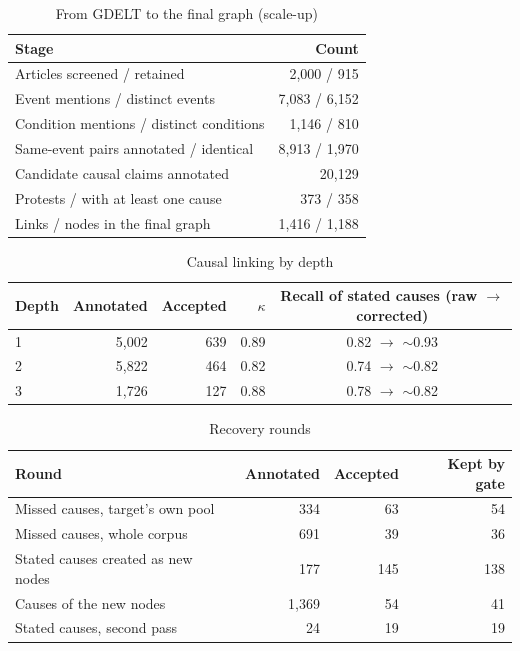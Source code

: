 \documentclass[pdflatex,sn-basic,lineno]{sn-jnl}
\theoremstyle{thmstylethree}
\theoremstyle{thmstyleone}
\begin{document}
\begin{table}[!htbp]
\caption{From GDELT to the final graph (scale-up)}
\label{tab:funnel}
\footnotesize
\begin{tabular*}{\textwidth}{@{\extracolsep\fill}lr@{}}
\toprule
Stage & Count \\
\midrule
Articles screened / retained & 2{,}000 / 915 \\
Event mentions / distinct events & 7{,}083 / 6{,}152 \\
Condition mentions / distinct conditions & 1{,}146 / 810 \\
Same-event pairs annotated / identical & 8{,}913 / 1{,}970 \\
Candidate causal claims annotated & 20{,}129 \\
Protests / with at least one cause & 373 / 358 \\
Links / nodes in the final graph & 1{,}416 / 1{,}188 \\
\bottomrule
\end{tabular*}
\end{table}

\begin{table}[!htbp]
\caption{Causal linking by depth}
\label{tab:levels}
\footnotesize
\begin{tabular*}{\textwidth}{@{\extracolsep\fill}lrrrc@{}}
\toprule
Depth & Annotated & Accepted & $\kappa$ & Recall of stated causes (raw $\rightarrow$ corrected) \\
\midrule
1 & 5{,}002 & 639 & 0.89 & 0.82 $\rightarrow$ $\sim$0.93 \\
2 & 5{,}822 & 464 & 0.82 & 0.74 $\rightarrow$ $\sim$0.82 \\
3 & 1{,}726 & 127 & 0.88 & 0.78 $\rightarrow$ $\sim$0.82 \\
\bottomrule
\end{tabular*}
\end{table}

\begin{table}[!htbp]
\caption{Recovery rounds}
\label{tab:rescue}
\footnotesize
\begin{tabular*}{\textwidth}{@{\extracolsep\fill}lrrr@{}}
\toprule
Round & Annotated & Accepted & Kept by gate \\
\midrule
Missed causes, target's own pool & 334 & 63 & 54 \\
Missed causes, whole corpus & 691 & 39 & 36 \\
Stated causes created as new nodes & 177 & 145 & 138 \\
Causes of the new nodes & 1{,}369 & 54 & 41 \\
Stated causes, second pass & 24 & 19 & 19 \\
\bottomrule
\end{tabular*}
\end{table}
\end{document}
